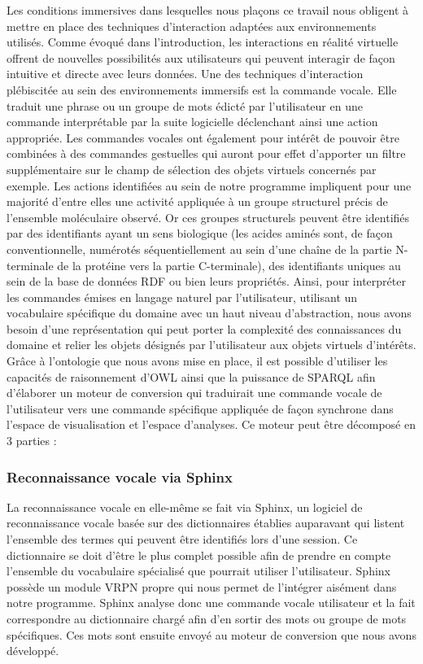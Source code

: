 Les conditions immersives dans lesquelles nous plaçons ce travail nous obligent à mettre en place des techniques d'interaction adaptées aux environnements utilisés. Comme évoqué dans l'introduction, les interactions en réalité virtuelle offrent de nouvelles possibilités aux utilisateurs qui peuvent interagir de façon intuitive et directe avec leurs données. Une des techniques d'interaction plébiscitée au sein des environnements immersifs est la commande vocale. Elle traduit une phrase ou un groupe de mots édicté par l'utilisateur en une commande interprétable par la suite logicielle déclenchant ainsi une action appropriée. Les commandes vocales ont également pour intérêt de pouvoir être combinées à des commandes gestuelles qui auront pour effet d'apporter un filtre supplémentaire sur le champ de sélection des objets virtuels concernés par exemple.
Les actions identifiées au sein de notre programme impliquent pour une majorité d'entre elles une activité appliquée à un groupe structurel précis de l'ensemble moléculaire observé. Or ces groupes structurels peuvent être identifiés par des identifiants ayant un sens biologique (les acides aminés sont, de façon conventionnelle, numérotés séquentiellement au sein d'une chaîne de la partie N-terminale de la protéine vers la partie C-terminale), des identifiants uniques au sein de la base de données RDF ou bien leurs propriétés. Ainsi, pour interpréter les commandes émises en langage naturel par l'utilisateur, utilisant un vocabulaire spécifique du domaine avec un haut niveau d'abstraction, nous avons besoin d'une représentation qui peut porter la complexité des connaissances du domaine et relier les objets désignés par l'utilisateur aux objets virtuels d'intérêts.
Grâce à l'ontologie que nous avons mise en place, il est possible d'utiliser les capacités de raisonnement d'OWL ainsi que la puissance de SPARQL afin d'élaborer un moteur de conversion qui traduirait une commande vocale de l'utilisateur vers une commande spécifique appliquée de façon synchrone dans l'espace de visualisation et l'espace d'analyses.
Ce moteur peut être décomposé en 3 parties :

\subsubsection{Reconnaissance vocale via Sphinx}

La reconnaissance vocale en elle-même se fait via Sphinx, un logiciel de reconnaissance vocale basée sur des dictionnaires établies auparavant qui listent l'ensemble des termes qui peuvent être identifiés lors d'une session. Ce dictionnaire se doit d'être le plus complet possible afin de prendre en compte l'ensemble du vocabulaire spécialisé que pourrait utiliser l'utilisateur. Sphinx possède un module VRPN propre qui nous permet de l'intégrer aisément dans notre programme. Sphinx analyse donc une commande vocale utilisateur et la fait correspondre au dictionnaire chargé afin d'en sortir des mots ou groupe de mots spécifiques. Ces mots sont ensuite envoyé au moteur de conversion que nous avons développé.


